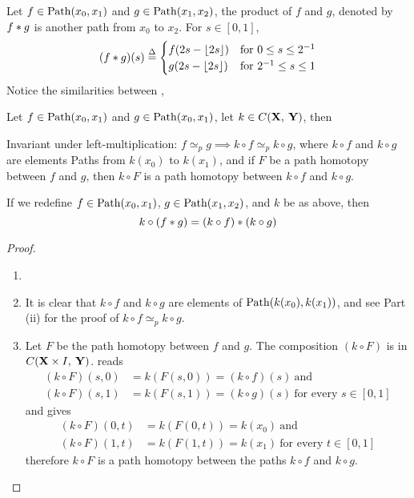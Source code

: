 \documentclass[../main-manifolds.tex]{subfiles}
\providecommand{\phtp}{\simeq_p} %
\begin{document}
\begin{definition}\label{munkres:product-of-paths}
    Let $f\in\Path[x_0,x_1]$ and $g\in\Path[x_1,x_2]$, the product of $f$ and $g$, denoted by $f\ast g$ is another path from $x_0$ to $x_2$. For $s\in[0,1]$, 
    \begin{equation}\label{munkres:product-of-paths-equation}
        (f\ast g)(s) \overset{\Delta}{=}\begin{cases}
            f(2s-\lfloor2s\rfloor) & \text{for } 0\leq s\leq 2^{-1}\\
            g(2s-\lfloor2s\rfloor) & \text{for } 2^{-1}\leq s\leq 1\\
        \end{cases}
    \end{equation}
    Notice the similarities between , 
\end{definition}
\begin{wts}
    Let $f\in\Path[x_0,x_1]$ and $g\in\Path[x_0,x_1]$, let $k\in C({\mathbf{X}},\: {\mathbf{Y}})$, then
    \begin{enumroman}
        \item Invariant under left-multiplication: $f\phtp g\implies k\circ f\phtp k\circ g$, where $k\circ f$ and $k\circ g$ are elements Paths from $k(x_0)$ to $k(x_1)$, and if $F$ be a path homotopy between $f$ and $g$, then $k\circ F$ is a path homotopy between $k\circ f$ and $k\circ g$.
        \item If we redefine $f\in\Path[x_0,x_1]$, $g\in\Path[x_1,x_2]$, and $k$ be as above, then 
        \[
            k\circ(f\ast g)=(k\circ f)\ast(k\circ g)
        \]
    \end{enumroman}
\end{wts}
\begin{proof}
        \begin{enumerate}[label={Proof of Part (\roman*): },leftmargin=*]
        \item[]
        \item It is clear that $k\circ f$ and $k\circ g$ are elements of $\Path[k(x_0),k(x_1)]$, and see Part (ii) for the proof of $k\circ f\phtp k\circ g$.
        \item Let $F$ be the path homotopy between $f$ and $g$. The composition $(k\circ F)$ is in $C({\mathbf{X}}\times I,\: {\mathbf{Y}})$.  reads
        \begin{align*}
            (k\circ F)(s,0)&=k(F(s,0))=(k\circ f)(s)\: \text{and}\\ 
            (k\circ F)(s,1)&=k(F(s,1))=(k\circ g)(s)\: \text{for every }s\in[0,1]
        \end{align*}    
        and  gives
        \begin{align*}
            (k\circ F)(0,t)&=k(F(0,t))=k(x_0)\: \text{and}\\
            (k\circ F)(1,t)&=k(F(1,t))=k(x_1)\: \text{for every }t\in[0,1]
        \end{align*}    
        therefore $k\circ F$ is a path homotopy between the paths $k\circ f$ and $k\circ g$.
    \end{enumerate}
\end{proof}
\end{document}
